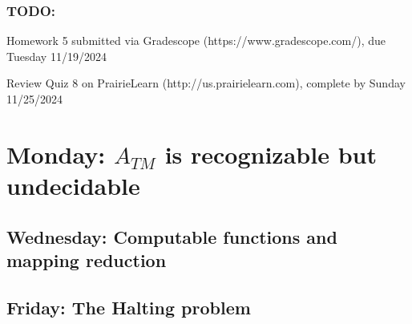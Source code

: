 \vspace{-20pt}

\subsubsection*{TODO:}
\begin{list}{\itemsep-10pt}
   \item Homework 5 submitted via Gradescope (https://www.gradescope.com/), due Tuesday 11/19/2024
   \item Review Quiz 8 on PrairieLearn (http://us.prairielearn.com), complete by Sunday 11/25/2024
\end{list}

\newpage

\section*{Monday: $A_{TM}$ is recognizable but undecidable}


    
\newpage
\subsection*{Wednesday: Computable functions and mapping reduction}




\newpage
\subsection*{Friday: The Halting problem}



